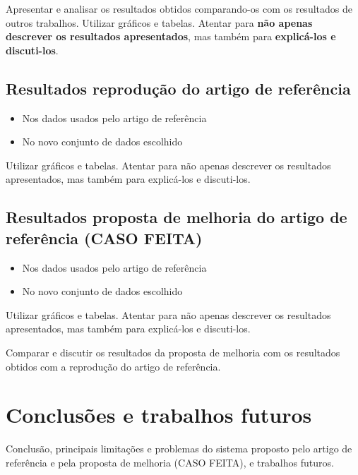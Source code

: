 \documentclass[conference]{IEEEtran}
\begin{document}
Apresentar e analisar os resultados obtidos comparando-os com os resultados de outros trabalhos. Utilizar gráficos e tabelas. Atentar para \textbf{não apenas descrever os resultados apresentados}, mas também para \textbf{explicá-los e discuti-los}.

\subsection{Resultados reprodução do artigo de referência}

\begin{itemize}
    \item Nos dados usados pelo artigo de referência
    \item No novo conjunto de dados escolhido
\end{itemize}

Utilizar gráficos e tabelas. Atentar para não apenas descrever os resultados apresentados, mas também para explicá-los e discuti-los.

\subsection{Resultados proposta de melhoria do artigo de referência (CASO FEITA)}

\begin{itemize}
    \item Nos dados usados pelo artigo de referência
    \item No novo conjunto de dados escolhido
\end{itemize}

Utilizar gráficos e tabelas. Atentar para não apenas descrever os resultados apresentados, mas também para explicá-los e discuti-los.

Comparar e discutir os resultados da proposta de melhoria com os resultados obtidos com a reprodução do artigo de referência.

\section{Conclusões e trabalhos futuros}

Conclusão, principais limitações e problemas do sistema proposto pelo artigo de referência e pela proposta de melhoria (CASO FEITA), e trabalhos futuros.
\end{document}
